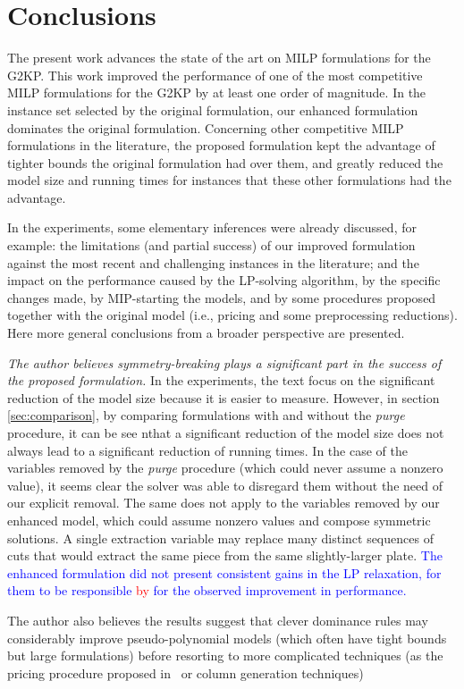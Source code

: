 \documentclass[ppgc,tese,english,formais,babel]{iiufrgs}
\newif\iffinalversion
\newcommand{\newtext}[1]{\iffinalversion%
#1%
\else%
\textcolor{blue}{#1}%
\fi%
}
\newcommand{\oldtext}[1]{\iffinalversion%
\else%
\textcolor{red}{#1}%
\fi%
}
\begin{document}




\chapter{Conclusions}
\label{sec:conclusions}

The present work advances the state of the art on MILP formulations for the G2KP.
This work improved the performance of one of the most competitive MILP formulations for the G2KP by at least one order of magnitude.
In the instance set selected by the original formulation, our enhanced formulation dominates the original formulation.
Concerning other competitive MILP formulations in the literature, the proposed formulation kept the advantage of tighter bounds the original formulation had over them, and greatly reduced the model size and running times for instances that these other formulations had the advantage.

In the experiments, some elementary inferences were already discussed, for example: the limitations (and partial success) of our improved formulation against the most recent and challenging instances in the literature; and the impact on the performance caused by the LP-solving algorithm, by the specific changes made, by MIP-starting the models, and by some procedures proposed together with the original model (i.e., pricing and some preprocessing reductions).
Here more general conclusions from a broader perspective are presented.

\emph{The author believes symmetry-breaking plays a significant part in the success of the proposed formulation.}
In the experiments, the text focus on the significant reduction of the model size because it is easier to measure.
However, in section \cref{sec:comparison}, by comparing formulations with and without the \emph{purge} procedure, it can be see nthat a significant reduction of the model size does not always lead to a significant reduction of running times.
In the case of the variables removed by the \emph{purge} procedure (which could never assume a nonzero value), it seems clear the solver was able to disregard them without the need of our explicit removal.
The same does not apply to the variables removed by our enhanced model, which could assume nonzero values and compose symmetric solutions.
A single extraction variable may replace many distinct sequences of cuts that would extract the same piece from the same slightly-larger plate.
\newtext{The enhanced formulation did not present consistent gains in the LP relaxation, for them to be responsible \oldtext{by}\newtext{for} the observed improvement in performance.}
The author also believes the results suggest that clever dominance rules may considerably improve pseudo-polynomial models (which often have tight bounds but large formulations) before resorting to more complicated techniques (as the pricing procedure proposed in~\citet{furini:2016} or column generation techniques)
\end{document}
